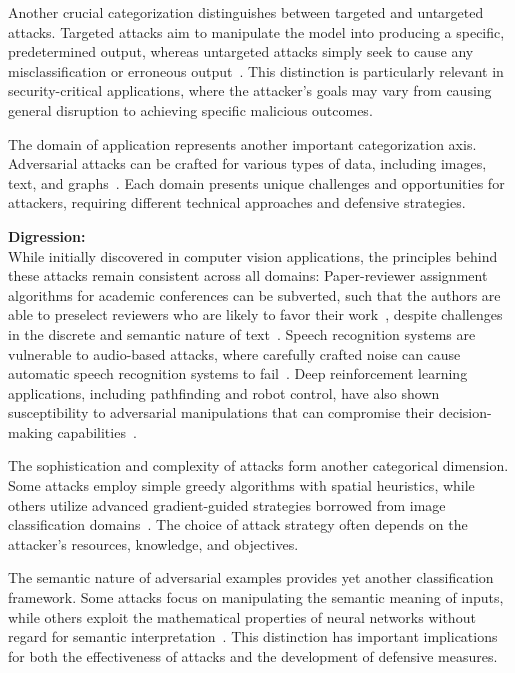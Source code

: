 \documentclass[a4paper, oneside]{discothesis}
\begin{document}
Another crucial categorization distinguishes between targeted and untargeted attacks. Targeted attacks aim to manipulate the model into producing a specific, predetermined output, whereas untargeted attacks simply seek to cause any misclassification or erroneous output~\cite{capozzi2024adversarial, Kashyap2024AdversarialAA}. This distinction is particularly relevant in security-critical applications, where the attacker's goals may vary from causing general disruption to achieving specific malicious outcomes.

The domain of application represents another important categorization axis. Adversarial attacks can be crafted for various types of data, including images, text, and graphs~\cite{Kashyap2024AdversarialAA}. Each domain presents unique challenges and opportunities for attackers, requiring different technical approaches and defensive strategies.

\begin{highlightbox}
	\textbf{Digression:} \\

	While initially discovered in computer vision applications, the principles behind these attacks remain consistent across all domains: Paper-reviewer assignment algorithms for academic conferences can be subverted, such that the authors are able to preselect reviewers who are likely to favor their work~\cite{eisenhofer2023no}, despite challenges in the discrete and semantic nature of text~\cite{Han2022TextAA}. Speech recognition systems are vulnerable to audio-based attacks, where carefully crafted noise can cause automatic speech recognition systems to fail~\cite{rajaratnam2018noise}. Deep reinforcement learning applications, including pathfinding and robot control, have also shown susceptibility to adversarial manipulations that can compromise their decision-making capabilities~\cite{Bai2018AdversarialEC}.
\end{highlightbox}

The sophistication and complexity of attacks form another categorical dimension. Some attacks employ simple greedy algorithms with spatial heuristics, while others utilize advanced gradient-guided strategies borrowed from image classification domains~\cite{capozzi2024adversarial}. The choice of attack strategy often depends on the attacker's resources, knowledge, and objectives.

The semantic nature of adversarial examples provides yet another classification framework. Some attacks focus on manipulating the semantic meaning of inputs, while others exploit the mathematical properties of neural networks without regard for semantic interpretation~\cite{browne2020semantics}. This distinction has important implications for both the effectiveness of attacks and the development of defensive measures.
\end{document}

